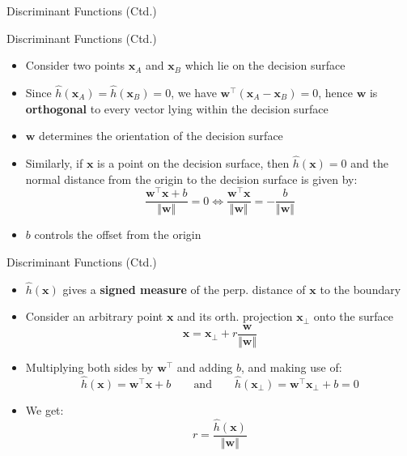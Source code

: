 \begin{frame}{Discriminant Functions (Ctd.)}{}
	\vspace*{-2mm}
	
\end{frame}


\begin{frame}{Discriminant Functions (Ctd.)}{}
	\begin{itemize}
		\item Consider two points $\bm{x}_A$ and $\bm{x}_B$ which lie on the decision surface
		\item Since $\widehat{h}(\bm{x}_A) = \widehat{h}(\bm{x}_B) = 0$, we have $\bm{w}^{\intercal}(\bm{x}_A - \bm{x}_B) = 0$,
			hence $\bm{w}$ is \textbf{orthogonal} to every vector lying within the decision surface
		\item $\bm{w}$ determines the orientation of the decision surface
		\item Similarly, if $\bm{x}$ is a point on the decision surface, then $\widehat{h}(\bm{x}) = 0$ and the normal distance from the
			origin to the decision surface is given by:
		\begin{equation}
			\frac{\bm{w}^{\intercal} \bm{x} + b}{\Vert \bm{w} \Vert} = 0
			\Leftrightarrow
			\frac{\bm{w}^{\intercal} \bm{x}}{\Vert \bm{w} \Vert} = -\frac{b}{\Vert \bm{w} \Vert}
		\end{equation}
		\item $b$ controls the offset from the origin
	\end{itemize}
\end{frame}


\begin{frame}{Discriminant Functions (Ctd.)}{}
	\begin{itemize}
		\item $\widehat{h}(\bm{x})$ gives a \textbf{signed measure} of the perp. distance of $\bm{x}$ to the boundary
		\item Consider an arbitrary point $\bm{x}$ and its orth. projection $\bm{x}_{\perp}$ onto the surface
		\begin{equation}
			\bm{x} = \bm{x}_{\perp} + r \frac{\bm{w}}{\Vert \bm{w} \Vert}
		\end{equation}
		\item Multiplying both sides by $\bm{w}^{\intercal}$ and adding $b$, and making use of:
		\begin{equation*}
			\widehat{h}(\bm{x})
				= \bm{w}^{\intercal} \bm{x} + b \qquad \text{and} \qquad
			\widehat{h}(\bm{x}_{\perp})
				= \bm{w}^{\intercal} \bm{x}_{\perp} + b = 0			
		\end{equation*}
		\item We get:
		\begin{equation}
			r = \frac{\widehat{h}(\bm{x})}{\Vert \bm{w} \Vert}
		\end{equation}
	\end{itemize}
\end{frame}


